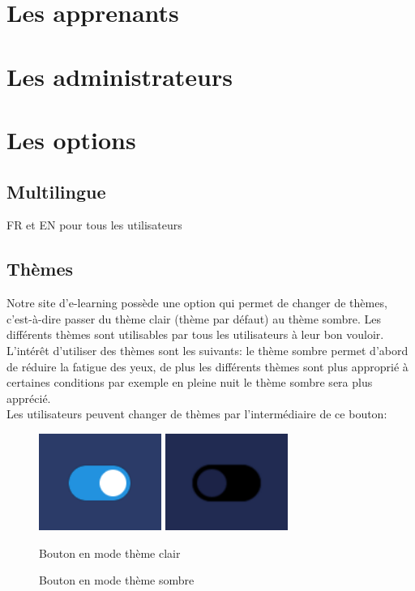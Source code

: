 \documentclass[a4paper,10pt]{article}
\begin{document}
\section{Les apprenants}

\section{Les administrateurs}


\section{Les options}
\subsection{Multilingue}
FR et EN pour tous les utilisateurs 

\subsection{Thèmes}
Notre site d'e-learning possède une option qui permet de changer de thèmes, c'est-à-dire passer du thème clair (thème par défaut) au thème sombre. Les différents thèmes sont utilisables par tous les utilisateurs à leur bon vouloir. L'intérêt d'utiliser des thèmes sont les suivants: le thème sombre permet d’abord de réduire la fatigue des yeux, de plus les différents thèmes sont plus approprié à certaines conditions par exemple en pleine nuit le thème sombre sera plus apprécié.\\

Les utilisateurs peuvent changer de thèmes par l'intermédiaire de ce bouton:
\begin{figure}[!h]
\centerline{
    \includegraphics[width=4cm]{images/boutonThemeClaire.PNG}
    \includegraphics[width=4cm]{images/boutonThemeSombre.PNG}
}
\caption{Bouton en mode thème clair}
\caption{Bouton en mode thème sombre}
\label{fig}
\end{figure}
\end{document}
